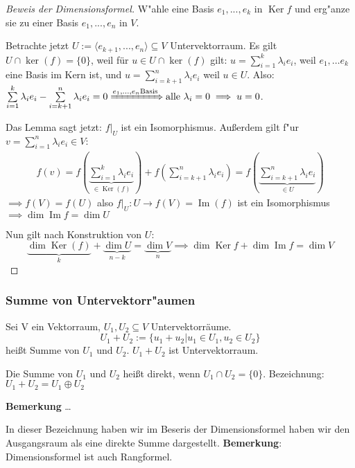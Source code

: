 \documentclass[11pt]{article}
\DeclareMathOperator{\mdim}{dim}
\DeclareMathOperator{\mKer}{Ker}
\DeclareMathOperator{\mIm}{Im}
\theoremstyle{remark}
\theoremstyle{definition}
\theoremstyle{remark}
\begin{document}
\begin{proof}[Beweis der Dimensionsformel] \label{}
W"ahle eine Basis \({e_1, ..., e_k}\) in \(\mKer f\) und erg"anze sie zu einer Basis
\({e_1, ..., e_n}\) in \(V\).

Betrachte jetzt \(U:=\langle e_{k+1}, ..., e_n\rangle \subseteq V\) Untervektorraum. Es gilt $U \cap \ker(f) = \{0\}$, weil für $u\in U \cap \ker(f)$ gilt: \(u = \sum\limits_{i=1}^k \lambda_ie_i \), weil \(e_1, \dots e_k\) eine Basis im Kern ist, und \(u = \sum\limits_{i=k+1}^{n} \lambda_i e_i\) weil \(u\in U\). Also: \(\sum\limits_{i=1}^k \lambda_ie_i - \sum\limits_{i=k+1}^{n} \lambda_ie_i = 0 \xRightarrow{e_1,\dots, e_n \text{Basis}} \text{alle }\lambda_i = 0 \implies u =0\).

Das Lemma sagt jetzt: \(f|_U\) ist ein Isomorphismus. Außerdem gilt f"ur \(v =\sum\limits_{i=1}^{n}\lambda_ie_i \in V:\)
\begin{align*}
f(v) = f\left(\underbrace{\sum_{i=1}^{k}\lambda_ie_i}_{\in \mKer(f)}\right) + f\left(\sum_{i=k+1}^{n}\lambda_ie_i\right) = f\left(\underbrace{\sum_{i=k+1}^{n} \lambda_ie_i}_{\in U}\right)
\end{align*}
\(\implies f(V)=f(U)\) also \(f|_U : U\to f(V) = \mIm(f) \) ist ein Isomorphismus \(\implies \mdim \mIm f = \mdim U \)

Nun gilt nach Konstruktion von \(U\): \[\underbrace{\mdim \mKer(f)}_{k} + \underbrace{\mdim U}_{n-k} = \underbrace{\mdim V}_{n} \implies \mdim\mKer f + \mdim\mIm f = \mdim V \]
\end{proof}

\subsubsection{Summe von Untervektorr"aumen}
\label{sec:org83dfe63}
\begin{definition}{}{}
	Sei V ein Vektorraum, $U_1, U_2 \subseteq V$ Untervektorräume.
	\[U_1 + U_2 := \{u_1+u_2 | u_1 \in U_1, u_2 \in U_2\}\]
	heißt Summe von $U_1$ und $U_2$.
	$U_1 + U_2$ ist Untervektorraum.
	
\end{definition}
\begin{definition}{}{}
Die Summe von $U_1$ und $U_2$ heißt direkt, wenn $U_1 \cap U_2 = \{0\}$. Bezeichnung: $U_1 + U_2 = U_1 \oplus U_2$
\end{definition}

\textbf{Bemerkung} \ldots{}

In dieser Bezeichnung haben wir im Beseris der Dimensionsformel haben wir den
Ausgangsraum als eine direkte Summe dargestellt. 
\textbf{Bemerkung}: Dimensionsformel ist auch Rangformel.
\end{document}
